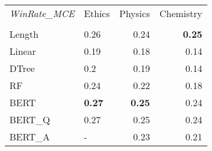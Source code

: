 \begin{tabular}{llrr}
\toprule
\textit{WinRate\_MCE} & Ethics &  Physics &  Chemistry \\
  &        &          &            \\
\midrule
Length &   0.26 &     0.24 &       \textbf{0.25} \\
Linear &   0.19 &     0.18 &       0.14 \\
DTree  &    0.2 &     0.19 &       0.14 \\
RF     &   0.24 &     0.22 &       0.18 \\
BERT   &   \textbf{0.27} &     \textbf{0.25} &       0.24 \\
BERT\_Q &   0.27 &     0.25 &       0.24 \\
BERT\_A &      - &     0.23 &       0.21 \\
\bottomrule
\end{tabular}
